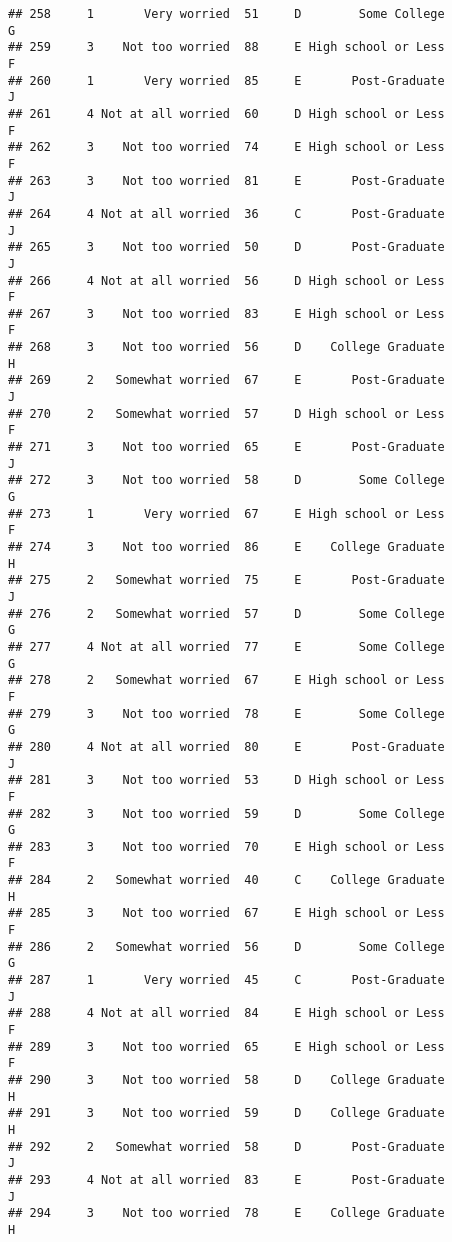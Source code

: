 \documentclass[
]{article}
\begin{document}
\begin{verbatim}
## 258     1       Very worried  51     D        Some College         G
## 259     3    Not too worried  88     E High school or Less         F
## 260     1       Very worried  85     E       Post-Graduate         J
## 261     4 Not at all worried  60     D High school or Less         F
## 262     3    Not too worried  74     E High school or Less         F
## 263     3    Not too worried  81     E       Post-Graduate         J
## 264     4 Not at all worried  36     C       Post-Graduate         J
## 265     3    Not too worried  50     D       Post-Graduate         J
## 266     4 Not at all worried  56     D High school or Less         F
## 267     3    Not too worried  83     E High school or Less         F
## 268     3    Not too worried  56     D    College Graduate         H
## 269     2   Somewhat worried  67     E       Post-Graduate         J
## 270     2   Somewhat worried  57     D High school or Less         F
## 271     3    Not too worried  65     E       Post-Graduate         J
## 272     3    Not too worried  58     D        Some College         G
## 273     1       Very worried  67     E High school or Less         F
## 274     3    Not too worried  86     E    College Graduate         H
## 275     2   Somewhat worried  75     E       Post-Graduate         J
## 276     2   Somewhat worried  57     D        Some College         G
## 277     4 Not at all worried  77     E        Some College         G
## 278     2   Somewhat worried  67     E High school or Less         F
## 279     3    Not too worried  78     E        Some College         G
## 280     4 Not at all worried  80     E       Post-Graduate         J
## 281     3    Not too worried  53     D High school or Less         F
## 282     3    Not too worried  59     D        Some College         G
## 283     3    Not too worried  70     E High school or Less         F
## 284     2   Somewhat worried  40     C    College Graduate         H
## 285     3    Not too worried  67     E High school or Less         F
## 286     2   Somewhat worried  56     D        Some College         G
## 287     1       Very worried  45     C       Post-Graduate         J
## 288     4 Not at all worried  84     E High school or Less         F
## 289     3    Not too worried  65     E High school or Less         F
## 290     3    Not too worried  58     D    College Graduate         H
## 291     3    Not too worried  59     D    College Graduate         H
## 292     2   Somewhat worried  58     D       Post-Graduate         J
## 293     4 Not at all worried  83     E       Post-Graduate         J
## 294     3    Not too worried  78     E    College Graduate         H

\end{verbatim}
\end{document}
